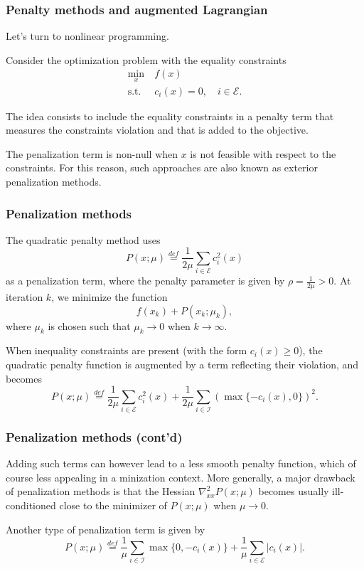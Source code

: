 
\begin{frame}
\frametitle{Penalty methods and augmented Lagrangian}

Let's turn to {\red nonlinear programming}.

\mbox{}

Consider the optimization problem with the equality constraints
\begin{align*}
\min_x\ & f(x) \\
\mbox{s.t. } & c_i(x) = 0,\quad i \in \mathcal{E}.
\end{align*}

The idea consists to include the equality constraints in a penalty term that measures the constraints violation and that is added to the objective.

\mbox{}

The penalization term is non-null when $x$ is not feasible with respect to the constraints.
For this reason, such approaches are also known as {\blue exterior penalization methods}.

\end{frame}

\begin{frame}
\frametitle{Penalization methods}

The quadratic penalty method uses
\[
P(x;\mu) \overset{def}{=} \frac{1}{2\mu} \sum_{i \in \mathcal{E}} c_i^2(x)
\]
as a penalization term, where the penalty parameter is given by $\rho = \frac{1}{2\mu} > 0$.
At iteration $k$, we minimize the function
\[
f(x_k) + P(x_k;\mu_k),
\]
where $\mu_k$ is chosen such that $\mu_k \rightarrow 0$ when $k \rightarrow \infty$.

\mbox{}

When inequality constraints are present (with the form $c_i(x) \geq
0$), the quadratic penalty function is augmented by a term reflecting their violation, and becomes
\[
P(x;\mu) \overset{def}{=} \frac{1}{2\mu} \sum_{i \in \mathcal{E}}
c_i^2(x) + \frac{1}{2\mu} \sum_{i \in \mathcal{I}} (\max \lbrace
-c_i(x), 0 \rbrace)^2.
\]

\end{frame}

\begin{frame}
\frametitle{Penalization methods (cont'd)}

Adding such terms can however lead to a less smooth penalty function, which of course less appealing in a minization context.
More generally, a major drawback of penalization methods is that the Hessian $\nabla_{xx}^2 P(x; \mu)$ becomes usually ill-conditioned close to the minimizer of  $P(x; \mu)$ when $\mu \rightarrow 0$.

\mbox{}

Another type of penalization term is given by
\[
P(x;\mu) \overset{def}{=} \frac{1}{\mu} \sum_{i \in \mathcal{I}}
\max \lbrace 0, -c_i(x) \rbrace + \frac{1}{\mu} \sum_{i \in
\mathcal{E}} |c_i(x)|.
\]

\end{frame}

